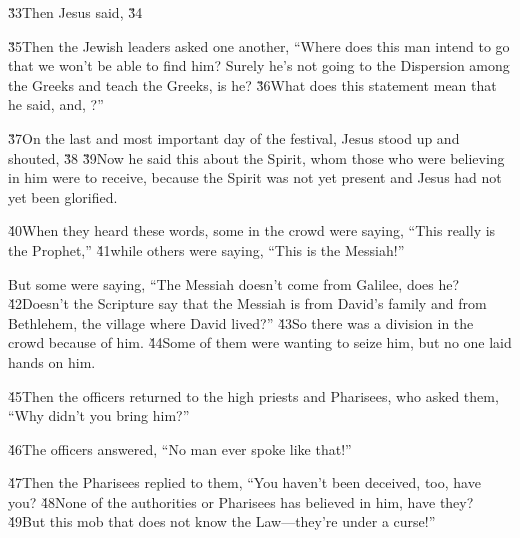 \v{33}Then Jesus said,  \v{34}

\v{35}Then the Jewish leaders asked one another, ``Where does this man intend to go that we won't be able to find him? Surely he's not going to the Dispersion among the Greeks and teach the Greeks, is he? \v{36}What does this statement mean that he said,  and, ?''

\v{37}On the last and most important day of the festival, Jesus stood up and shouted,  \v{38} \v{39}Now he said this about the Spirit, whom those who were believing in him were to receive, because the Spirit was not yet present and Jesus had not yet been glorified.

\v{40}When they heard these words, some in the crowd were saying, ``This really is the Prophet,'' \v{41}while others were saying, ``This is the Messiah!''

But some were saying, ``The Messiah doesn't come from Galilee, does he? \v{42}Doesn't the Scripture say that the Messiah is from David's family and from Bethlehem, the village where David lived?'' \v{43}So there was a division in the crowd because of him. \v{44}Some of them were wanting to seize him, but no one laid hands on him.

\v{45}Then the officers returned to the high priests and Pharisees, who asked them, ``Why didn't you bring him?''

\v{46}The officers answered, ``No man ever spoke like that!''

\v{47}Then the Pharisees replied to them, ``You haven't been deceived, too, have you? \v{48}None of the authorities or Pharisees has believed in him, have they? \v{49}But this mob that does not know the Law---they're under a curse!''


